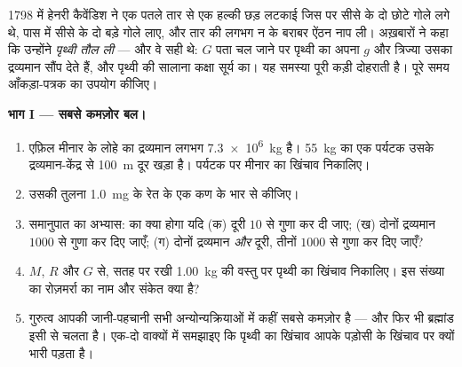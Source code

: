 \begin{problem}[{सप्ताहांत समस्या --- एक छप्पर में रखे सीसे के दो गोलों
से पृथ्वी के, और फिर सूर्य के द्रव्यमान तक: एक छोटा-सा नियतांक, एक बार
नाप लेने पर, किस काम आता है}]
\label{pb:g10:universal-gravitation:1}
1798 में हेनरी कैवेंडिश ने एक पतले तार से एक हल्की छड़ लटकाई जिस पर सीसे
के दो छोटे गोले लगे थे, पास में सीसे के दो बड़े गोले लाए, और तार की
लगभग न के बराबर ऐंठन नाप ली। अख़बारों ने कहा कि उन्होंने \emph{पृथ्वी
तौल ली} --- और वे सही थे: $G$ पता चल जाने पर पृथ्वी का अपना $g$
और त्रिज्या उसका द्रव्यमान सौंप देते हैं, और पृथ्वी की सालाना
कक्षा सूर्य का। यह समस्या पूरी कड़ी दोहराती है। पूरे समय
आँकड़ा-पत्रक का उपयोग कीजिए।

\medskip
\noindent\textbf{भाग I --- सबसे कमज़ोर बल।}
\begin{enumerate}
  \item एफ़िल मीनार के लोहे का द्रव्यमान लगभग \qty{7.3e6}{kg} है। \qty{55}{kg} का एक
        पर्यटक उसके द्रव्यमान-केंद्र से \qty{100}{m} दूर खड़ा है। पर्यटक पर
        मीनार का खिंचाव निकालिए।
  \item उसकी तुलना \qty{1.0}{mg} के रेत के एक कण के भार से कीजिए।
  \item समानुपात का अभ्यास:  का क्या होगा यदि
        (क) दूरी $10$ से गुणा कर दी जाए; (ख) दोनों द्रव्यमान $1000$
        से गुणा कर दिए जाएँ; (ग) दोनों द्रव्यमान \emph{और} दूरी, तीनों
        $1000$ से गुणा कर दिए जाएँ?
  \item $M$, $R$ और $G$ से, सतह पर रखी \qty{1.00}{kg} की वस्तु पर
        पृथ्वी का खिंचाव निकालिए। इस संख्या का रोज़मर्रा का नाम और
        संकेत क्या है?
  \item गुरुत्व आपकी जानी-पहचानी सभी अन्योन्यक्रियाओं में कहीं सबसे
        कमज़ोर है --- और फिर भी ब्रह्मांड इसी से चलता है। एक-दो वाक्यों
        में समझाइए कि पृथ्वी का खिंचाव आपके पड़ोसी के खिंचाव पर क्यों
        भारी पड़ता है।
\end{enumerate}


\end{problem}
